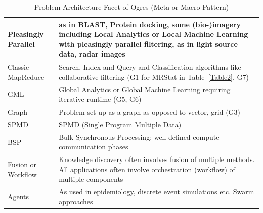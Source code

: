 \documentclass{acm_proc_article-sp}
\begin{document}
\begin{table}[t]
\centering
\caption{Problem Architecture Facet of Ogres (Meta or Macro Pattern)}
\label{Table6}
\begin{tabular}{|p{1.5cm}|p{5.75cm}|} \hline
Pleasingly Parallel & as in BLAST, Protein docking, some (bio-)imagery  including Local Analytics or Local Machine Learning with pleasingly parallel filtering, as in light source data, radar images \\ \hline 
Classic MapReduce & Search, Index and Query and Classification algorithms like collaborative filtering (G1 for MRStat in Table~\ref{Table2}, G7) \\ \hline
GML & Global Analytics or Global Machine Learning requiring iterative runtime (G5, G6) \\ \hline
Graph & Problem set up as a graph as opposed to vector, grid (G3) \\ \hline
SPMD & SPMD (Single Program Multiple Data) \\ \hline
BSP & Bulk Synchronous Processing: well-defined compute-communication phases \\ \hline
Fusion or Workflow & Knowledge discovery often involves fusion of multiple methods. All applications often involve orchestration (workflow) of multiple components \\ \hline
Agents & As used in epidemiology, discrete event simulations etc. Swarm approaches
\\ \hline
\end{tabular}
\end{table}
\end{document}
